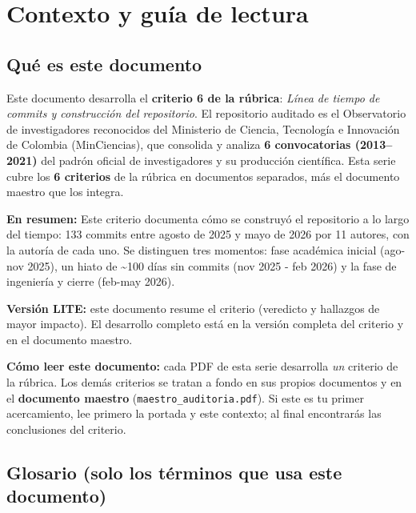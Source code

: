 \section{Contexto y guía de lectura}

\subsection{Qué es este documento}

Este documento desarrolla el \textbf{criterio 6 de la rúbrica}:
\emph{Línea de tiempo de commits y construcción del repositorio}. El repositorio auditado es el
Observatorio de investigadores reconocidos del Ministerio de Ciencia,
Tecnología e Innovación de Colombia (MinCiencias), que consolida y analiza
\textbf{6 convocatorias (2013--2021)} del padrón oficial de investigadores
y su producción científica. Esta serie cubre los \textbf{6 criterios} de la
rúbrica en documentos separados, más el documento maestro que los integra.

\textbf{En resumen:} Este criterio documenta cómo se construyó el repositorio a lo largo del tiempo: 133 commits entre agosto de 2025 y mayo de 2026 por 11 autores, con la autoría de cada uno. Se distinguen tres momentos: fase académica inicial (ago-nov 2025), un hiato de \textasciitilde{}100 días sin commits (nov 2025 - feb 2026) y la fase de ingeniería y cierre (feb-may 2026).


\begin{tcolorbox}[nota]\textbf{Versión LITE:} este documento resume el criterio (veredicto y hallazgos de mayor impacto). El desarrollo completo está en la versión completa del criterio y en el documento maestro.\end{tcolorbox}

\begin{tcolorbox}[nota]
\textbf{Cómo leer este documento:} cada PDF de esta serie desarrolla \emph{un}
criterio de la rúbrica. Los demás criterios se tratan a fondo en sus propios
documentos y en el \textbf{documento maestro} (\texttt{maestro\_auditoria.pdf}).
Si este es tu primer acercamiento, lee primero la portada y este contexto; al
final encontrarás las conclusiones del criterio.
\end{tcolorbox}

\subsection{Glosario (solo los términos que usa este documento)}

